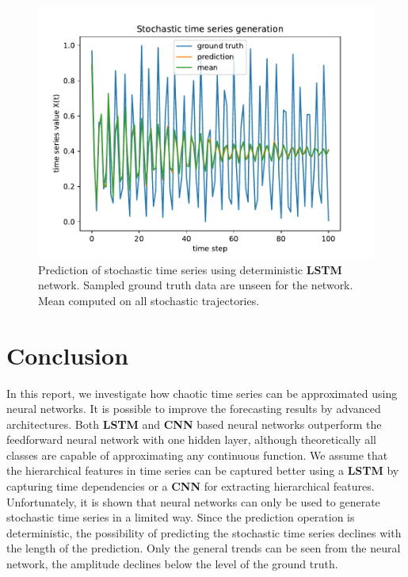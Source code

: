 \documentclass{article}
\begin{document}
\begin{figure}
  \centering
  \includegraphics[width=\textwidth]{figures/nn_limitation.pdf}
  \caption{Prediction of stochastic time series using deterministic 
  \textbf{LSTM} network. Sampled ground truth data are unseen for the network.
  Mean computed on all stochastic trajectories.}
  \label{fig:nn_limitation}
\end{figure}

\section{Conclusion}

In this report, we investigate how chaotic time series can be approximated
using neural networks. It is possible to improve the forecasting results by 
advanced architectures. Both \textbf{LSTM} and \textbf{CNN} based neural
networks outperform the feedforward neural network with one hidden layer,
although theoretically all classes are capable of approximating any continuous
function. We assume that the hierarchical features in time series can be 
captured better using a \textbf{LSTM} by capturing time dependencies or a 
\textbf{CNN} for extracting hierarchical features. 
Unfortunately, it is shown that neural networks can only be used to
generate stochastic time series in a limited way. Since the prediction operation
is deterministic, the possibility of predicting the stochastic time series
declines with the length of the prediction. Only the general trends can be seen
from the neural network, the amplitude declines below the level of the 
ground truth.



\end{document}
